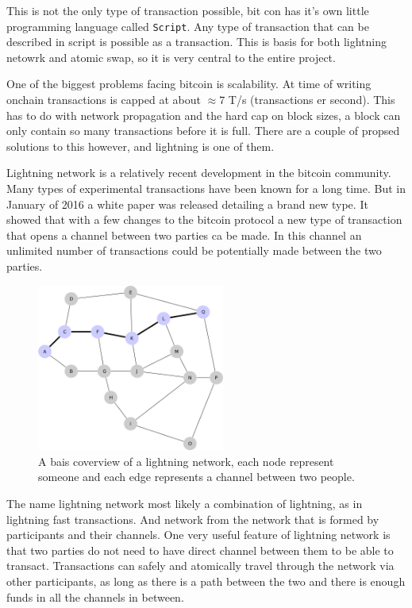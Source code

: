 This is not the only type of transaction possible, bit con has it's own little programming language called \texttt{Script}. Any type of transaction that can be described in script is possible as a transaction. This is basis for both lightning netowrk and atomic swap, so it is very central to the entire project. 

One of the biggest problems facing bitcoin is scalability. At time of writing onchain transactions is capped at about $\approx 7$ T/s (transactions er second). This has to do with network propagation and the hard cap on block sizes, a block can only contain so many transactions before it is full. There are a couple of propsed solutions to this however, and lightning is one of them. 

Lightning network is a relatively recent development in the bitcoin community. Many types of experimental transactions have been known for a long time. But in January of 2016 a white paper was released detailing a brand new type. It showed that with a few changes to the bitcoin protocol a new type of transaction that opens a channel between two parties ca be made. In this channel an unlimited number of transactions could be potentially made between the two parties. 

\begin{figure}[H]
	\centering
	\includegraphics[width=0.55\textwidth]{introduction/images/mesh_network.png}
	\caption{A bais coverview of a lightning network, each node represent someone and each edge represents a channel between two people.}
	\label{fig:blockchain2}
\end{figure}

The name lightning network most likely a combination of lightning, as in lightning fast transactions. And network from the network that is formed by participants and their channels. One very useful feature of lightning network is that two parties do not need to have direct channel between them to be able to transact. Transactions can safely and atomically travel through the network via other participants, as long as there is a path between the two and there is enough funds in all the channels in between. 

